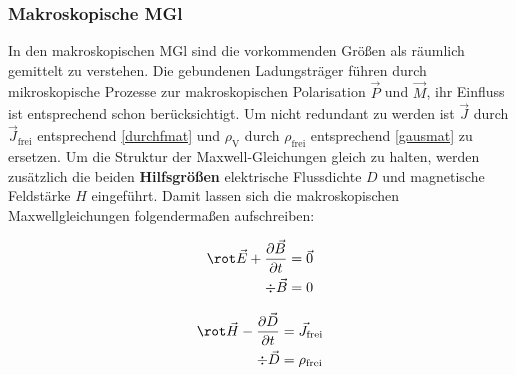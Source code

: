  \subsubsection{Makroskopische MGl}\label{makrmax}
 In den makroskopischen MGl sind die vorkommenden Größen als räumlich gemittelt zu verstehen. Die gebundenen Ladungsträger führen durch mikroskopische Prozesse zur makroskopischen Polarisation $\vec{P}$ und $\vec{M}$, ihr Einfluss ist entsprechend schon berücksichtigt. Um nicht redundant zu werden ist $\vec{J}$ durch $\vec{J}_\text{frei}$ entsprechend \ref{durchfmat} und $\rho_\text{V}$ durch $\rho_\text{frei}$ entsprechend \ref{gausmat} zu ersetzen. Um die Struktur der Maxwell-Gleichungen gleich zu halten, werden zusätzlich die beiden \textbf{Hilfsgrößen} elektrische Flussdichte $D$ und magnetische Feldstärke $H$ eingeführt. Damit lassen sich die makroskopischen Maxwellgleichungen folgendermaßen aufschreiben:\\
 \begin{minipage}{0.5\textwidth}
	\begin{align}
		\rot\vec{E}+ \frac{\partial \vec{B}}{\partial t} & = \vec{0}\\
		\div\vec{B}                                      & =0
	\end{align}
\end{minipage}
\begin{minipage}{0.5\textwidth}
	\begin{align}
		\rot\vec{H}-\frac{\partial\vec{D}}{\partial t} & =\vec{J}_\text{frei}\\
		\div\vec{D}                                    & =\rho_\text{frei}
	\end{align}
\end{minipage}

